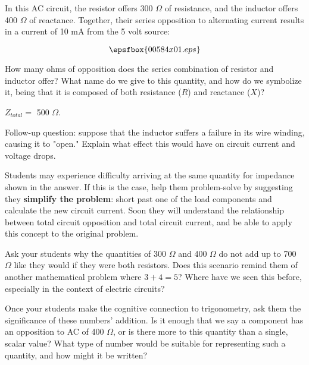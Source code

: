 

In this AC circuit, the resistor offers 300 $\Omega$ of resistance, and the inductor offers 400 $\Omega$ of reactance.  Together, their series opposition to alternating current results in a current of 10 mA from the 5 volt source:

$$\epsfbox{00584x01.eps}$$

How many ohms of opposition does the series combination of resistor and inductor offer?  What name do we give to this quantity, and how do we symbolize it, being that it is composed of both resistance ($R$) and reactance ($X$)?







$Z_{total} =$ 500 $\Omega$.

\vskip 10pt

Follow-up question: suppose that the inductor suffers a failure in its wire winding, causing it to "open."  Explain what effect this would have on circuit current and voltage drops.







Students may experience difficulty arriving at the same quantity for impedance shown in the answer.  If this is the case, help them problem-solve by suggesting they {\bf simplify the problem}: short past one of the load components and calculate the new circuit current.  Soon they will understand the relationship between total circuit opposition and total circuit current, and be able to apply this concept to the original problem.

Ask your students why the quantities of 300 $\Omega$ and 400 $\Omega$ do not add up to 700 $\Omega$ like they would if they were both resistors.  Does this scenario remind them of another mathematical problem where $3 + 4 = 5$?  Where have we seen this before, especially in the context of electric circuits?

Once your students make the cognitive connection to trigonometry, ask them the significance of these numbers' addition.  Is it enough that we say a component has an opposition to AC of 400 $\Omega$, or is there more to this quantity than a single, scalar value?  What type of number would be suitable for representing such a quantity, and how might it be written?




